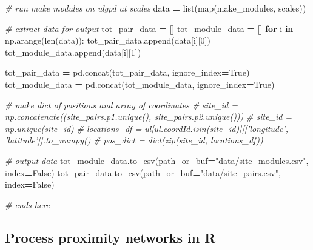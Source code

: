 \documentclass[]{article}
\newenvironment{Shaded}{\begin{snugshade}}{\end{snugshade}}
\newcommand{\BuiltInTok}[1]{#1}
\newcommand{\CommentTok}[1]{\textcolor[rgb]{0.56,0.35,0.01}{\textit{#1}}}
\newcommand{\ControlFlowTok}[1]{\textcolor[rgb]{0.13,0.29,0.53}{\textbf{#1}}}
\newcommand{\DecValTok}[1]{\textcolor[rgb]{0.00,0.00,0.81}{#1}}
\newcommand{\KeywordTok}[1]{\textcolor[rgb]{0.13,0.29,0.53}{\textbf{#1}}}
\newcommand{\NormalTok}[1]{#1}
\newcommand{\OperatorTok}[1]{\textcolor[rgb]{0.81,0.36,0.00}{\textbf{#1}}}
\newcommand{\StringTok}[1]{\textcolor[rgb]{0.31,0.60,0.02}{#1}}
\newcommand{\VariableTok}[1]{\textcolor[rgb]{0.00,0.00,0.00}{#1}}
\begin{document}
\begin{Shaded}
\begin{Highlighting}[numbers=left,,]
\CommentTok{# run make modules on ulgpd at scales}
\NormalTok{data }\OperatorTok{=} \BuiltInTok{list}\NormalTok{(}\BuiltInTok{map}\NormalTok{(make_modules, scales))}

\CommentTok{# extract data for output}
\NormalTok{tot_pair_data }\OperatorTok{=}\NormalTok{ []}
\NormalTok{tot_module_data }\OperatorTok{=}\NormalTok{ []}
\ControlFlowTok{for}\NormalTok{ i }\KeywordTok{in}\NormalTok{ np.arange(}\BuiltInTok{len}\NormalTok{(data)):}
\NormalTok{    tot_pair_data.append(data[i][}\DecValTok{0}\NormalTok{])}
\NormalTok{    tot_module_data.append(data[i][}\DecValTok{1}\NormalTok{])}

\NormalTok{tot_pair_data }\OperatorTok{=}\NormalTok{ pd.concat(tot_pair_data, ignore_index}\OperatorTok{=}\VariableTok{True}\NormalTok{)}
\NormalTok{tot_module_data }\OperatorTok{=}\NormalTok{ pd.concat(tot_module_data, ignore_index}\OperatorTok{=}\VariableTok{True}\NormalTok{)}

\CommentTok{# make dict of positions and array of coordinates}
\CommentTok{# site_id = np.concatenate((site_pairs.p1.unique(), site_pairs.p2.unique()))}
\CommentTok{# site_id = np.unique(site_id)}
\CommentTok{# locations_df = ul[ul.coordId.isin(site_id)][['longitude', 'latitude']].to_numpy()}
\CommentTok{# pos_dict = dict(zip(site_id, locations_df))}

\CommentTok{# output data}
\NormalTok{tot_module_data.to_csv(path_or_buf}\OperatorTok{=}\StringTok{"data/site_modules.csv"}\NormalTok{, index}\OperatorTok{=}\VariableTok{False}\NormalTok{)}
\NormalTok{tot_pair_data.to_csv(path_or_buf}\OperatorTok{=}\StringTok{"data/site_pairs.csv"}\NormalTok{, index}\OperatorTok{=}\VariableTok{False}\NormalTok{)}

\CommentTok{# ends here}
\end{Highlighting}
\end{Shaded}

\hypertarget{process-proximity-networks-in-r}{%
\subsection{Process proximity networks in R}\label{process-proximity-networks-in-r}}
\end{document}
